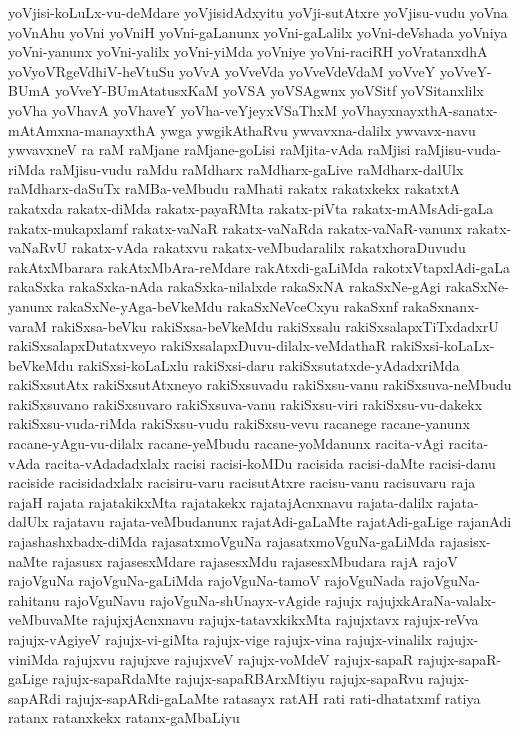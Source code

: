 {yoVjisi-koLuLx-vu-deMdare
yoVjisidAdxyitu
yoVji-sutAtxre
yoVjisu-vudu
yoVna
yoVnAhu
yoVni
yoVniH
yoVni-gaLanunx
yoVni-gaLalilx
yoVni-deVshada
yoVniya
yoVni-yanunx
yoVni-yalilx
yoVni-yiMda
yoVniye
yoVni-raciRH
yoVratanxdhA
yoVyoVRgeVdhiV-heVtuSu
yoVvA
yoVveVda
yoVveVdeVdaM
yoVveY
yoVveY-BUmA
yoVveY-BUmAtatusxKaM
yoVSA
yoVSAgwnx
yoVSitf
yoVSitanxlilx
yoVha
yoVhavA
yoVhaveY
yoVha-veYjeyxVSaThxM
yoVhayxnayxthA-sanatx-mAtAmxna-manayxthA
ywga
ywgikAthaRvu
ywvavxna-dalilx
ywvavx-navu
ywvavxneV
ra
raM
raMjane
raMjane-goLisi
raMjita-vAda
raMjisi
raMjisu-vuda-riMda
raMjisu-vudu
raMdu
raMdharx
raMdharx-gaLive
raMdharx-dalUlx
raMdharx-daSuTx
raMBa-veMbudu
raMhati
rakatx
rakatxkekx
rakatxtA
rakatxda
rakatx-diMda
rakatx-payaRMta
rakatx-piVta
rakatx-mAMsAdi-gaLa
rakatx-mukapxlamf
rakatx-vaNaR
rakatx-vaNaRda
rakatx-vaNaR-vanunx
rakatx-vaNaRvU
rakatx-vAda
rakatxvu
rakatx-veMbudaralilx
rakatxhoraDuvudu
rakAtxMbarara
rakAtxMbAra-reMdare
rakAtxdi-gaLiMda
rakotxVtapxlAdi-gaLa
rakaSxka
rakaSxka-nAda
rakaSxka-nilalxde
rakaSxNA
rakaSxNe-gAgi
rakaSxNe-yanunx
rakaSxNe-yAga-beVkeMdu
rakaSxNeVceCxyu
rakaSxnf
rakaSxnanx-varaM
rakiSxsa-beVku
rakiSxsa-beVkeMdu
rakiSxsalu
rakiSxsalapxTiTxdadxrU
rakiSxsalapxDutatxveyo
rakiSxsalapxDuvu-dilalx-veMdathaR
rakiSxsi-koLaLx-beVkeMdu
rakiSxsi-koLaLxlu
rakiSxsi-daru
rakiSxsutatxde-yAdadxriMda
rakiSxsutAtx
rakiSxsutAtxneyo
rakiSxsuvadu
rakiSxsu-vanu
rakiSxsuva-neMbudu
rakiSxsuvano
rakiSxsuvaro
rakiSxsuva-vanu
rakiSxsu-viri
rakiSxsu-vu-dakekx
rakiSxsu-vuda-riMda
rakiSxsu-vudu
rakiSxsu-vevu
racanege
racane-yanunx
racane-yAgu-vu-dilalx
racane-yeMbudu
racane-yoMdanunx
racita-vAgi
racita-vAda
racita-vAdadadxlalx
racisi
racisi-koMDu
racisida
racisi-daMte
racisi-danu
raciside
racisidadxlalx
racisiru-varu
racisutAtxre
racisu-vanu
racisuvaru
raja
rajaH
rajata
rajatakikxMta
rajatakekx
rajatajAcnxnavu
rajata-dalilx
rajata-dalUlx
rajatavu
rajata-veMbudanunx
rajatAdi-gaLaMte
rajatAdi-gaLige
rajanAdi
rajashashxbadx-diMda
rajasatxmoVguNa
rajasatxmoVguNa-gaLiMda
rajasisx-naMte
rajasusx
rajasesxMdare
rajasesxMdu
rajasesxMbudara
rajA
rajoV
rajoVguNa
rajoVguNa-gaLiMda
rajoVguNa-tamoV
rajoVguNada
rajoVguNa-rahitanu
rajoVguNavu
rajoVguNa-shUnayx-vAgide
rajujx
rajujxkAraNa-valalx-veMbuvaMte
rajujxjAcnxnavu
rajujx-tatavxkikxMta
rajujxtavx
rajujx-reVva
rajujx-vAgiyeV
rajujx-vi-giMta
rajujx-vige
rajujx-vina
rajujx-vinalilx
rajujx-viniMda
rajujxvu
rajujxve
rajujxveV
rajujx-voMdeV
rajujx-sapaR
rajujx-sapaR-gaLige
rajujx-sapaRdaMte
rajujx-sapaRBArxMtiyu
rajujx-sapaRvu
rajujx-sapARdi
rajujx-sapARdi-gaLaMte
ratasayx
ratAH
rati
rati-dhatatxmf
ratiya
ratanx
ratanxkekx
ratanx-gaMbaLiyu
}
